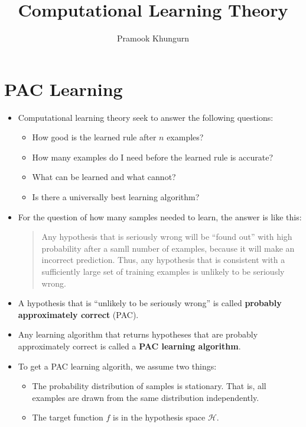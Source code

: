 \documentclass[10pt]{article}
\title{Computational Learning Theory}
\author{Pramook Khungurn}
\begin{document}
\maketitle

\section{PAC Learning}
\begin{itemize}
    \item Computational learning theory seek to answer the following
        questions:
        \begin{itemize}
            \item How good is the learned rule after $n$ examples?
            \item How many examples do I need before the learned rule
                is accurate?
            \item What can be learned and what cannot?
            \item Is there a universally best learning algorithm?
        \end{itemize}
    
    \item For the question of how many samples needed to learn, the
        answer is like this:
        \begin{quote}
            Any hypothesis that is seriously wrong will be 
            ``found out'' with high probability after a samll
            number of examples, because it will make an incorrect
            prediction. Thus, any hypothesis that is consistent
            with a sufficiently large set of training examples is
            unlikely to be seriously wrong.              
        \end{quote}
        
    \item A hypothesis that is ``unlikely to be seriously wrong''
        is called {\bf probably approximately correct} (PAC).
        
    \item Any learning algorithm that returns hypotheses that
        are probably approximately correct is called a
        {\bf PAC learning algorithm}.
        
    \item To get a PAC learning algorith, we assume two things:
        \begin{itemize}
            \item The probability distribution of samples 
                is stationary. That is, all examples are drawn 
                from the same distribution independently.
            \item The target function $f$ is in the hypothesis
                space $\mathcal{H}$.
        \end{itemize}


\end{itemize}
\end{document}
